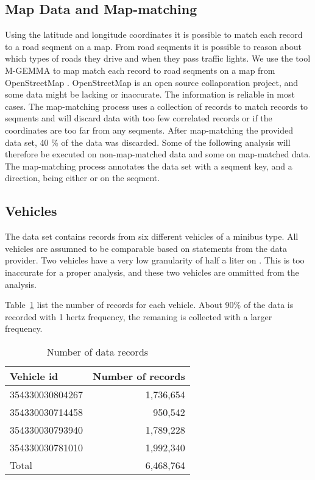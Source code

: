 \subsection{Map Data and Map-matching}
Using the latitude and longitude coordinates it is possible to match each record to a road seqment on a map.
From road seqments it is possible to reason about which types of roads they drive and when they pass traffic lights.
We use the tool M-GEMMA \cite{} to map match each record to road seqments on a map from OpenStreetMap \cite{}.
OpenStreetMap is an open source collaporation project, and some data might be lacking or inaccurate. 
The information is reliable in most cases.
The map-matching process uses a collection of records to match records to seqments and will discard data with too few correlated records or if the coordinates are too far from any seqments.
After map-matching the provided data set, 40 \% of the data was discarded. %
Some of the following analysis will therefore be executed on non-map-matched data and some on map-matched data. 
The map-matching process annotates the data set with a seqment key,  and a direction,  being either  or  on the seqment.


\subsection{Vehicles} \label{sec:dataDescriptionVehicles}
The data set contains records from six different vehicles of a minibus type. 
All vehicles are assumned to be comparable based on statements from the data provider. %
Two vehicles have a very low granularity of half a liter on . 
This is too inaccurate for a proper analysis, and these two vehicles are ommitted from the analysis.  

Table~\ref{tb:NoRecords} list the number of records for each vehicle. 
About 90\% of the data is recorded with 1 hertz frequency, the remaning is collected with a larger frequency.
\begin{table}
\centering
\begin{tabular}{l|r}
Vehicle id		& Number of records \\\hline
354330030804267 & 1,736,654\\\hline
354330030714458 & 950,542\\\hline
354330030793940 & 1,789,228\\\hline
354330030781010 & 1,992,340\\\hline
Total			& 6,468,764
\end{tabular}
\caption{Number of data records}
\label{tb:NoRecords}
\end{table}



